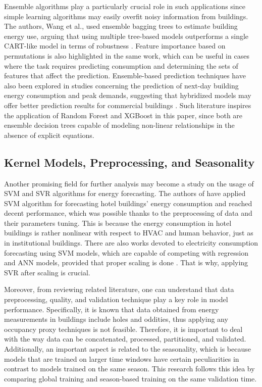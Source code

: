 \documentclass[conference]{IEEEtran}
\begin{document}
Ensemble algorithms play a particularly crucial role in such applications since
simple learning algorithms may easily overfit noisy information from buildings.
The authors, Wang et al., used ensemble bagging trees to estimate building
energy use, arguing that using multiple tree-based models outperforms a single
CART-like model in terms of robustness \cite{Wang2018EnsembleLearning}.
Feature importance based on permutations is also highlighted in the same work,
which can be useful in cases where the task requires predicting consumption
and determining the sets of features that affect the prediction. Ensemble-based
prediction techniques have also been explored in studies concerning the
prediction of next-day building energy consumption and peak demands,
suggesting that hybridized models may offer better prediction results for
commercial buildings \cite{Fan2014NextDayBuildingEnergy}. Such literature
inspires the application of Random Forest and XGBoost in this paper, since both
are ensemble decision trees capable of modeling non-linear relationships in the
absence of explicit equations.

\subsection{Kernel Models, Preprocessing, and Seasonality}

Another promising field for further analysis may become a study on the usage of SVM and SVR algorithms for energy forecasting. The authors of \cite{Shao2020HotelSVM} have applied SVM algorithm for forecasting hotel buildings' energy consumption and reached decent performance, which was possible thanks to the preprocessing of data and their parameters tuning. This is because the energy consumption in hotel buildings is rather nonlinear with respect to HVAC and human behavior, just as in institutional buildings. There are also works devoted to electricity consumption forecasting using SVM models, which are capable of competing with regression and ANN models, provided that proper scaling is done \cite{Kaytez2015ForecastingElectricity}. That is why, applying SVR after scaling is crucial.

Moreover, from reviewing related literature, one can understand that data preprocessing, quality, and validation technique play a key role in model performance. Specifically, it is known that data obtained from energy measurements in buildings include holes and oddities, thus applying any occupancy proxy techniques is not feasible. Therefore, it is important to deal with the way data can be concatenated, processed, partitioned, and validated. Additionally, an important aspect is related to the seasonality, which is because models that are trained on larger time windows have certain peculiarities in contrast to models trained on the same season. This research follows this idea by comparing global training and season-based training on the same validation time.
\end{document}
